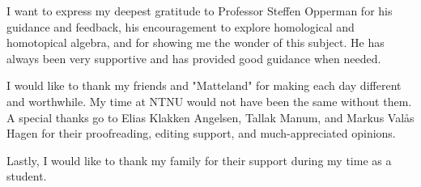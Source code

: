 \documentclass[../thesis.tex]{subfiles}
\begin{document}
        I want to express my deepest gratitude to Professor Steffen Opperman for his guidance and feedback, his encouragement to explore homological and homotopical algebra, and for showing me the wonder of this subject. He has always been very supportive and has provided good guidance when needed.

        I would like to thank my friends and "Matteland" for making each day different and worthwhile. My time at NTNU would not have been the same without them. A special thanks go to Elias Klakken Angelsen, Tallak Manum, and Markus Valås Hagen for their proofreading, editing support, and much-appreciated opinions.
        
        Lastly, I would like to thank my family for their support during my time as a student.
\end{document}
